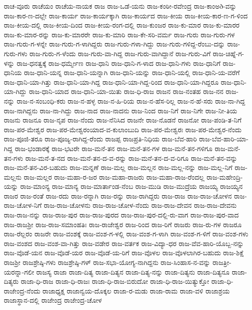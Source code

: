 ರಾಚ-ವೂರು
ರಾಚೆಯಂ
ರಾಚೆಯ-ನಾಯಕ
ರಾಜ
ರಾಜ-ಒಡೆ-ಯನು
ರಾಜ-ಕಂಠೀ-ರವೇಂದ್ರ
ರಾಜ-ಕಾಂಅð-ವನ್ನು
ರಾಜ-ಕಾರ-ಣ-ದಲ್ಲೇ
ರಾಜ-ಕಾರ್ಯ
ರಾಜ-ಕಾರ್ಯಕ್ಕಾಗಿ
ರಾಜ-ಕಾರ್ಯದ
ರಾಜ-ಕೀಯ
ರಾಜ-ಕೀಯ-ಕಾರ-ಣ-ಗ-ಳಿಂದ
ರಾಜ-ಕೀಯ-ದಲ್ಲಿ
ರಾಜ-ಕೀಯ-ದಿಂದ
ರಾಜ-ಕೀಯ-ರಂಗ-ದಲ್ಲಿ
ರಾಜ-ಕುಂಜರ
ರಾಜ-ಕು-ಮಾರ
ರಾಜ-ಕು-ಮಾರರ
ರಾಜ-ಕು-ಮಾರ-ರನ್ನು
ರಾಜ-ಕು-ಮಾರರೇ
ರಾಜ-ಕು-ಮಾರಿ
ರಾಜ-ಕೇ-ಸರಿ-ವರ್ಮ
ರಾಜ-ಗುರು
ರಾಜ-ಗುರು-ಗಳ
ರಾಜ-ಗುರು-ಗ-ಳನ್ನೇ
ರಾಜ-ಗುರು-ಗ-ಳಾಗಿದ್ದರು
ರಾಜ-ಗುರು-ಗಳಾ-ಗಿದ್ದು
ರಾಜ-ಗುರು-ಗಳಿದ್ದ-ರೆಂಬು-ದನ್ನು
ರಾಜ-ಗುರು-ಗಳು
ರಾಜ-ಗುರು-ಗ-ಳೆಂದು
ರಾಜ-ಗುರು-ವಾ-ಗಿದ್ದ
ರಾಜ-ಗುರು-ವಾಗಿದ್ದಾನೆ
ರಾಜ-ಗುರು-ವಿಗೆ
ರಾಜ-ಚಿಹ್ನೆ-ಗ-ಳನ್ನು
ರಾಜ-ಧನತ್ವಕ್ಕೆ
ರಾಜ-ಧರ್ಮ್ಮೇಣ
ರಾಜ-ಧಾನಿ
ರಾಜ-ಧಾನಿ-ಗ-ಳಾದ
ರಾಜ-ಧಾನಿ-ಗಳು
ರಾಜ-ಧಾನಿಗೆ
ರಾಜ-ಧಾನಿಯ
ರಾಜ-ಧಾನಿ-ಯನ್ನ
ರಾಜ-ಧಾನಿ-ಯನ್ನಾಗಿ
ರಾಜ-ಧಾನಿ-ಯನ್ನು
ರಾಜ-ಧಾನಿ-ಯಲ್ಲಿ
ರಾಜ-ಧಾನಿ-ಯ-ವರೆಗೆ
ರಾಜ-ಧಾನಿ-ಯಾ-ಗಿತ್ತು
ರಾಜ-ಧಾನಿ-ಯಾ-ಗಿದ್ದ
ರಾಜ-ಧಾನಿ-ಯಾ-ಗಿದ್ದ-ರಿಂದ
ರಾಜ-ಧಾನಿ-ಯಾ-ಗಿದ್ದರೂ
ರಾಜ-ಧಾನಿ-ಯಾ-ಗಿದ್ದು
ರಾಜ-ಧಾನಿ-ಯಾದ
ರಾಜ-ಧಾನಿ-ಯಾ-ಯಿತು
ರಾಜ-ಧಿ-ರಾಜ
ರಾಜನ
ರಾಜ-ನಂತಹ
ರಾಜ-ನನ
ರಾಜ-ನನ್ನು
ರಾಜ-ನ-ಸಂಬಂಧಿ-ಕರು
ರಾಜ-ನ-ಹಳ್ಳ
ರಾಜ-ನ-ಹಿ-ರಿಯ
ರಾಜ-ನ-ಹೆಸ-ರಿಲ್ಲ
ರಾಜ-ನ-ಹೆ-ಸರು
ರಾಜ-ನಾ-ಗಿದ್ದ
ರಾಜ-ನಾಗಿದ್ದನು
ರಾಜ-ನಾ-ಗಿದ್ದು
ರಾಜ-ನಾದ
ರಾಜ-ನಾದನು
ರಾಜ-ನಿಂದ
ರಾಜ-ನಿಗೆ
ರಾಜ-ನಿಗೇ
ರಾಜ-ನೀ-ತಿಯ
ರಾಜನು
ರಾಜನೂ
ರಾಜ-ನೃಪ
ರಾಜ-ನೆಂದು
ರಾಜ-ನೆನಿಸಿದ
ರಾಜನೇ
ರಾಜ-ನೊಡನೆ
ರಾಜನೋ
ರಾಜ-ಪಂಡಿ-ತ-ನಿಗೆ
ರಾಜ-ಪರ-ಮೇಶ್ವರ
ರಾಜ-ಪರ-ಮೇಶ್ವರಂಯಾದ-ವ-ಕುಲಾಂಬುದಿ
ರಾಜ-ಪರ-ಮೇಶ್ವರಃ
ರಾಜ-ಪರ-ಮೇಶ್ವರ-ನೆಂದು
ರಾಜ-ಪೂಜಿ-ತರೂ
ರಾಜ-ಪೂಜ್ಯ-ರಾಗಿದ್ದ-ರೆಂದು
ರಾಜಪ್ಪ
ರಾಜಪ್ರತಿ-ನಿಧಿಯ
ರಾಜ-ಬೆವ-ಹಾರಿ
ರಾಜ-ಬೆವ-ಹಾರಿ-ಯಾ-ಗಿದ್ದ
ರಾಜ-ಭಂಡಾರಕ್ಕೆ
ರಾಜ-ಭಟರೇ
ರಾಜ-ಮನೆ-ತನ
ರಾಜ-ಮನೆ-ತನ-ಗಳ
ರಾಜ-ಮನೆ-ತನ-ಗಳಿಗೂ
ರಾಜ-ಮನೆ-ತನ-ಗಳು
ರಾಜ-ಮನೆ-ತ-ನದ
ರಾಜ-ಮನೆ-ತನ-ದ-ವ-ರನ್ನು
ರಾಜ-ಮನೆ-ತನ-ದ-ವ-ರಿಗೂ
ರಾಜ-ಮನೆ-ತನ-ವನ್ನು
ರಾಜ-ಮನೆ-ತನ-ವಿರ-ಬಹುದು
ರಾಜ-ಮನ್ನಣೆ
ರಾಜ-ಮಲ್ಲ
ರಾಜ-ಮಲ್ಲನ
ರಾಜ-ಮಲ್ಲ-ನನ್ನು
ರಾಜ-ಮಲ್ಲ-ನಿಗೆ
ರಾಜ-ಮಲ್ಲನು
ರಾಜ-ಮಲ್ಲರ
ರಾಜ-ಮಹಾ-ರ-ಜರ
ರಾಜ-ಮಹಾ-ರಾಜರು
ರಾಜ-ಮಹಾ-ರಾಜ-ರೆಂದಲ್ಲ
ರಾಜ-ಮಹೇಂದ್ರಿ-ಯನ್ನು
ರಾಜ-ಮಾಂನ್ಯ
ರಾಜ-ಮಾನ್ಯ
ರಾಜ-ಮಾರ್ತಾಂಡ-ನೆಂಬ
ರಾಜ-ಮುಡಿ
ರಾಜ-ಮುದ್ರೆಯ
ರಾಜಯ್ಯ
ರಾಜಯ್ಯನ
ರಾಜರ
ರಾಜ-ರಂತೆ
ರಾಜ-ರದು
ರಾಜ-ರನ್ನಾಗಿ
ರಾಜ-ರನ್ನು
ರಾಜ-ರಾಗಿದ್ದರು
ರಾಜ-ರಾಜ
ರಾಜ-ರಾಜ-ಚೋಳನ
ರಾಜ-ರಾಜ-ಚೋಳ-ನಿಗೆ
ರಾಜ-ರಾಜ-ಚೋಳನು
ರಾಜ-ರಾಜ-ಚೋಳ-ನೆಂದು
ರಾಜ-ರಾಜ-ದೇವನ
ರಾಜ-ರಾಜ-ದೇವನು
ರಾಜ-ರಾಜ-ನನ್ನು
ರಾಜ-ರಾಜ-ಪುರ
ರಾಜ-ರಾಜ-ಪುರದ
ರಾಜ-ರಾಜ-ಪುರ-ದಲ್ಲಿ-ರು-ವಾಗ
ರಾಜ-ರಾಜ-ಪುರ-ವಾದ
ರಾಜ-ರಾಜಶ್ರೀ
ರಾಜ-ರಾಜ-ಸಮಾಂಹತಿಃ
ರಾಜ-ರಾಜೇಶ್ವರ
ರಾಜ-ರಿಂದ
ರಾಜ-ರಿಗೆ
ರಾಜರು
ರಾಜ-ರು-ಗಳ
ರಾಜರೂ
ರಾಜ-ರೆಲ್ಲರಂ
ರಾಜರೇ
ರಾಜ-ವಂಶಕ್ಕೆ
ರಾಜ-ವಂಶ-ಗ-ಳಲ್ಲಿ
ರಾಜ-ವಂಶ-ಗ-ಳಾಗಿ
ರಾಜ-ವಂಶ-ಗ-ಳಿಗೆ
ರಾಜ-ವಂಶ-ಗಳು
ರಾಜ-ವಂಶದ
ರಾಜ-ವಂಶ-ವಾ-ಗಿತ್ತು
ರಾಜ-ವಡೇರ
ರಾಜ-ವರ್ತಕ
ರಾಜ-ವಿದ್ಯಾ-ಧರ
ರಾಜ-ವೆವ-ಹಾರಿ-ಯೊಬ್ಬ-ನನ್ನು
ರಾಜ-ವೊಡೆ-ಯನ
ರಾಜ-ವೊಡೆ-ಯರ
ರಾಜ-ವೊಡೆ-ಯ-ರಿಗೆ
ರಾಜ-ವೊಳಲ
ರಾಜ-ವೊಳಲಾಗಿರ-ಬಹುದು
ರಾಜ-ಶಿಕ್ಷೆ
ರಾಜಶ್ರೀ
ರಾಜಶ್ರೇಷ್ಠಿ-ಗಳು
ರಾಜಶ್ರೇಷ್ಠಿ-ಗಳ್
ರಾಜ-ಸಭಾ-ಯೋಗ್ಯ-ನಾಗಿದ್ದನು
ರಾಜ-ಸಿಂಹಾಸ-ನ-ವನ್ನು
ರಾಜತ್ರೀ-ಯರನ್ನಾ-ಗಲೀ
ರಾಜಸ್ಯ
ರಾಜಾ
ರಾಜಾ-ದಿತ್ಯ
ರಾಜಾ-ದಿತ್ಯನ
ರಾಜಾ-ದಿತ್ಯ-ನನ್ನು
ರಾಜಾ-ದಿತ್ಯನು
ರಾಜಾ-ದಿತ್ಯನೂ
ರಾಜಾ-ದಿತ್ಯರು
ರಾಜಾ-ಧಿ-ರಾಜ
ರಾಜಾ-ಧಿ-ರಾಜಃ
ರಾಜಾ-ಧಿ-ರಾಜ-ಬಿರುದೋ
ರಾಜಾ-ಧಿ-ರಾಜ-ಯಿತ್ಯುಕ್ತೋ
ರಾಜಾ-ಧಿ-ರಾಜೇಂದ್ರ-ನೆಂದು
ರಾಜಾಧ್ಯಕ್ಷ
ರಾಜಾನ್ವಯ-ದೊಕ್ಕಲ
ರಾಜಾ-ರ-ಮಡು
ರಾಜಾ-ರಾಮ
ರಾಜಾ-ವಳಿ
ರಾಜಾಶ್ರಯ
ರಾಜಾಸ್ಥಾನ-ದಲ್ಲಿ
ರಾಜೇಂದ್ರ
ರಾಜೇಂದ್ರ-ಚೋಳ
